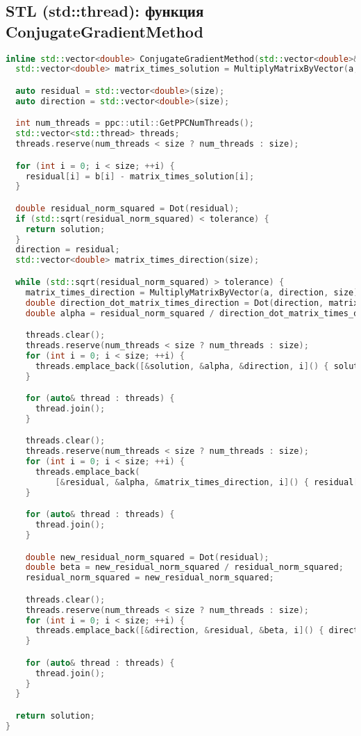\documentclass[12pt]{article}
\begin{document}
\subsection*{STL (std::thread): функция ConjugateGradientMethod}
\begin{lstlisting}[language=C++]
inline std::vector<double> ConjugateGradientMethod(std::vector<double>& a, std::vector<double>& b, std::vector<double> solution, double tolerance, int size) {
  std::vector<double> matrix_times_solution = MultiplyMatrixByVector(a, solution, size);

  auto residual = std::vector<double>(size);
  auto direction = std::vector<double>(size);

  int num_threads = ppc::util::GetPPCNumThreads();
  std::vector<std::thread> threads;
  threads.reserve(num_threads < size ? num_threads : size);

  for (int i = 0; i < size; ++i) {
    residual[i] = b[i] - matrix_times_solution[i];
  }

  double residual_norm_squared = Dot(residual);
  if (std::sqrt(residual_norm_squared) < tolerance) {
    return solution;
  }
  direction = residual;
  std::vector<double> matrix_times_direction(size);

  while (std::sqrt(residual_norm_squared) > tolerance) {
    matrix_times_direction = MultiplyMatrixByVector(a, direction, size);
    double direction_dot_matrix_times_direction = Dot(direction, matrix_times_direction);
    double alpha = residual_norm_squared / direction_dot_matrix_times_direction;

    threads.clear();
    threads.reserve(num_threads < size ? num_threads : size);
    for (int i = 0; i < size; ++i) {
      threads.emplace_back([&solution, &alpha, &direction, i]() { solution[i] += alpha * direction[i]; });
    }

    for (auto& thread : threads) {
      thread.join();
    }

    threads.clear();
    threads.reserve(num_threads < size ? num_threads : size);
    for (int i = 0; i < size; ++i) {
      threads.emplace_back(
          [&residual, &alpha, &matrix_times_direction, i]() { residual[i] -= alpha * matrix_times_direction[i]; });
    }

    for (auto& thread : threads) {
      thread.join();
    }

    double new_residual_norm_squared = Dot(residual);
    double beta = new_residual_norm_squared / residual_norm_squared;
    residual_norm_squared = new_residual_norm_squared;

    threads.clear();
    threads.reserve(num_threads < size ? num_threads : size);
    for (int i = 0; i < size; ++i) {
      threads.emplace_back([&direction, &residual, &beta, i]() { direction[i] = residual[i] + beta * direction[i]; });
    }

    for (auto& thread : threads) {
      thread.join();
    }
  }

  return solution;
}
\end{lstlisting}
\end{document}
